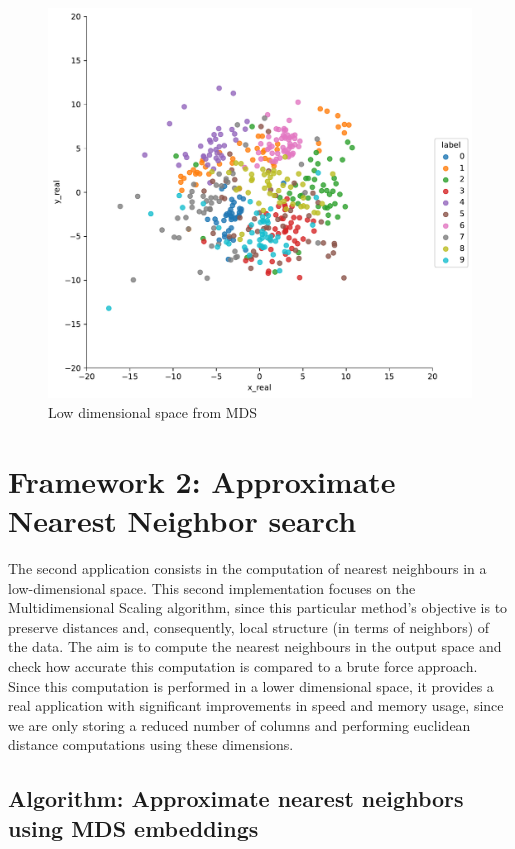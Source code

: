 \documentclass[a4paper,11pt,spanish]{report}
\begin{document}
\begin{figure}[p]
\centering
\includegraphics[width=12cm]{figures/app1plotrealmds.pdf}
\caption{\label{figureMDS}Low dimensional space from MDS}
\end{figure}

\newpage


\section{Framework 2: Approximate Nearest Neighbor search}
\label{sec:app2}

The second application consists in the computation of nearest neighbours in a low-dimensional space. This second implementation focuses on the Multidimensional Scaling algorithm, since this particular method's objective is to preserve distances and, consequently, local structure (in terms of neighbors) of the data. The aim is to compute the nearest neighbours in the output space and check how accurate this computation is compared to a brute force approach. Since this computation is performed in a lower dimensional space, it provides a real application with significant improvements in speed and memory usage, since we are only storing a reduced number of columns and performing euclidean distance computations using these dimensions.

\subsection{Algorithm: Approximate nearest neighbors using MDS embeddings}
\label{ssec:nneigh}
\end{document}
